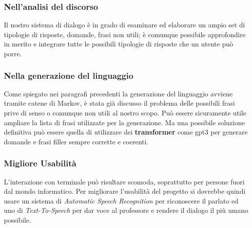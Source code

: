 \subsubsection{Nell'analisi del discorso}
Il nostro sistema di dialogo è in grado di esaminare ed elaborare un ampio set di tipologie di risposte, domande, frasi non utili; è comunque possibile approfondire in merito e integrare tutte le possibili tipologie di risposte che un utente può porre.
\subsubsection{Nella generazione del linguaggio}
Come spiegato nei paragrafi precedenti la generazione del linguaggio avviene tramite catene di Markov, è stata già discusso il problema delle possibili frasi prive di senso o comunque non utili al nostro scopo. Può essere sicuramente utile ampliare la lista di frasi utilizzate per la generazione. Ma una possibile soluzione definitiva può essere quella di utilizzare dei \textbf{transformer} come gpt3 per generare domande e frasi filler sempre corrette e coerenti.

\subsubsection{Migliore Usabilità}
L'interazione con terminale può risultare scomoda, soprattutto per persone fuori dal mondo informatico. Per migliorare l'usabilità del progetto si dovrebbe quindi usare un sistema di \textit{Automatic Speech Recognition} per riconoscere il parlato ed uno di \textit{Text-To-Speech} per dar voce al professore e rendere il dialogo il più umano possibile.
